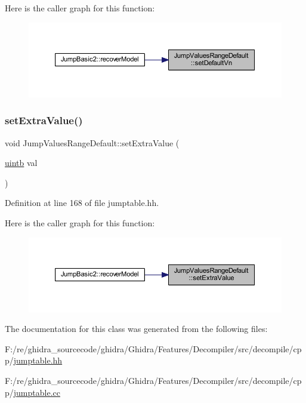 Here is the caller graph for this function\+:
\nopagebreak
\begin{figure}[H]
\begin{center}
\leavevmode
\includegraphics[width=350pt]{class_jump_values_range_default_a894c549442dbcc411f8ffe1fb89eb7c9_icgraph}
\end{center}
\end{figure}
\mbox{\label{class_jump_values_range_default_a69eef7fc97a9eae6d943e12c025bb714}} 
\subsubsection{\texorpdfstring{setExtraValue()}{setExtraValue()}}
{\footnotesize\ttfamily void Jump\+Values\+Range\+Default\+::set\+Extra\+Value (\begin{DoxyParamCaption}\item[{\mbox{\hyperlink{types_8h_a2db313c5d32a12b01d26ac9b3bca178f}{uintb}}}]{val }\end{DoxyParamCaption})\hspace{0.3cm}{\ttfamily [inline]}}



Definition at line 168 of file jumptable.\+hh.

Here is the caller graph for this function\+:
\nopagebreak
\begin{figure}[H]
\begin{center}
\leavevmode
\includegraphics[width=350pt]{class_jump_values_range_default_a69eef7fc97a9eae6d943e12c025bb714_icgraph}
\end{center}
\end{figure}


The documentation for this class was generated from the following files\+:\begin{DoxyCompactItemize}
\item 
F\+:/re/ghidra\+\_\+sourcecode/ghidra/\+Ghidra/\+Features/\+Decompiler/src/decompile/cpp/\mbox{\hyperlink{jumptable_8hh}{jumptable.\+hh}}\item 
F\+:/re/ghidra\+\_\+sourcecode/ghidra/\+Ghidra/\+Features/\+Decompiler/src/decompile/cpp/\mbox{\hyperlink{jumptable_8cc}{jumptable.\+cc}}\end{DoxyCompactItemize}
